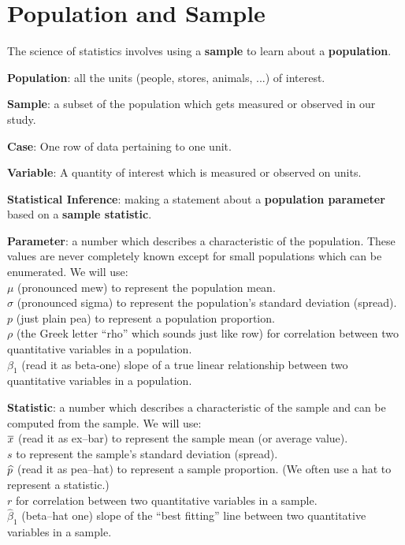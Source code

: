\def\theTopic{Reading 2}


 \section{ Population and Sample}


The science of statistics involves using a {\bf sample} to learn about
a {\bf population}.

{\bf Population}: all the units (people, stores, animals, ...) of
interest.

{\bf Sample}:  a subset of the population which gets measured or
observed in our study.

{\bf Case}:  One row of data pertaining to one unit.  

{\bf Variable}:  A quantity of interest which is measured or observed
on units.

{\bf Statistical  Inference}: making a statement about a
{\bf population parameter} based on a {\bf  sample statistic}.

{\bf Parameter}:  a number which describes a characteristic of the
population. These values are never completely known except for small
populations which can be enumerated. We will use:\\
  $\mu$ (pronounced mew) to represent the population mean.\\
  $\sigma$ (pronounced sigma) to represent the population's standard deviation
  (spread).\\
  $p$ (just plain pea) to represent a population proportion.\\
  $\rho$ (the Greek letter ``rho'' which sounds just like row) for
  correlation between two 
  quantitative variables in a population.\\
  $\beta_1$ (read it as beta-one) slope of a true
  linear relationship between  two 
  quantitative variables in a population.

{\bf Statistic}:  a number which describes a characteristic of the
sample and can be computed from the sample. We will use:\\
  $\overline{x}$ (read it as ex--bar) to represent the sample mean (or average value).\\
  $s$  to represent the sample's standard deviation
  (spread).\\
  $\widehat{p}$ (read it as pea--hat) to represent a sample proportion.  (We
  often use a hat to  represent a statistic.)\\
  $r$  for correlation between two  quantitative variables in a sample.\\
  $\widehat{\beta}_1$ (beta--hat one) slope of the ``best fitting''
  line  between  two  quantitative variables in a sample.


